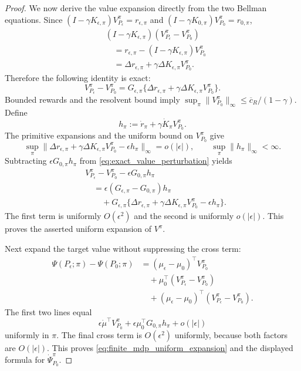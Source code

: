 \documentclass[10pt,a4paper]{amsart}
\begin{document}
\begin{proof}
    We now derive the value expansion directly from the two Bellman
    equations.  Since
    $(I-\gamma K_{\epsilon,\pi})V_{P_\epsilon}^\pi
      =r_{\epsilon,\pi}$ and
    $(I-\gamma K_{0,\pi})V_{P_0}^\pi=r_{0,\pi}$,
    \[
        \begin{aligned}
        &(I-\gamma K_{\epsilon,\pi})
        (V_{P_\epsilon}^\pi-V_{P_0}^\pi)\\
        &\quad=
        r_{\epsilon,\pi}
        -(I-\gamma K_{\epsilon,\pi})V_{P_0}^\pi\\
        &\quad=
        \Delta r_{\epsilon,\pi}
        +\gamma\Delta K_{\epsilon,\pi}V_{P_0}^\pi.
        \end{aligned}
    \]
    Therefore the following identity is exact:
    \begin{equation}\label{eq:exact_value_perturbation}
        V_{P_\epsilon}^\pi-V_{P_0}^\pi
        =
        G_{\epsilon,\pi}
        \{\Delta r_{\epsilon,\pi}
        +\gamma\Delta K_{\epsilon,\pi}V_{P_0}^\pi\}.
    \end{equation}
    Bounded rewards and the resolvent bound imply
    $\sup_\pi\|V_{P_0}^\pi\|_\infty
      \leq\overline c_R/(1-\gamma)$.
    Define
    \[
        h_\pi:=\dot r_\pi+\gamma\dot K_\pi V_{P_0}^\pi.
    \]
    The primitive expansions and the uniform bound on $V_{P_0}^\pi$
    give
    \[
        \sup_\pi
        \|\Delta r_{\epsilon,\pi}
        +\gamma\Delta K_{\epsilon,\pi}V_{P_0}^\pi
        -\epsilon h_\pi\|_\infty=o(|\epsilon|),
        \qquad
        \sup_\pi\|h_\pi\|_\infty<\infty.
    \]
    Subtracting $\epsilon G_{0,\pi}h_\pi$ from
    \eqref{eq:exact_value_perturbation} yields
    \[
        \begin{aligned}
        &V_{P_\epsilon}^\pi-V_{P_0}^\pi
        -\epsilon G_{0,\pi}h_\pi\\
        &\quad=
        \epsilon(G_{\epsilon,\pi}-G_{0,\pi})h_\pi\\
        &\qquad+
        G_{\epsilon,\pi}
        \{\Delta r_{\epsilon,\pi}
        +\gamma\Delta K_{\epsilon,\pi}V_{P_0}^\pi
        -\epsilon h_\pi\}.
        \end{aligned}
    \]
    The first term is uniformly $O(\epsilon^2)$ and the second is
    uniformly $o(|\epsilon|)$.  This proves the asserted uniform
    expansion of $V^\pi$.

    Next expand the target value without suppressing the cross term:
    \[
        \begin{aligned}
        \Psi(P_\epsilon;\pi)-\Psi(P_0;\pi)
        &=(\mu_\epsilon-\mu_0)^\top V_{P_0}^\pi\\
        &\quad+\mu_0^\top
        (V_{P_\epsilon}^\pi-V_{P_0}^\pi)\\
        &\quad+(\mu_\epsilon-\mu_0)^\top
        (V_{P_\epsilon}^\pi-V_{P_0}^\pi).
        \end{aligned}
    \]
    The first two lines equal
    \[
        \epsilon\dot\mu^\top V_{P_0}^\pi
        +\epsilon\mu_0^\top G_{0,\pi}h_\pi
        +o(|\epsilon|)
    \]
    uniformly in $\pi$.  The final cross term is
    $O(\epsilon^2)$ uniformly, because both factors are
    $O(|\epsilon|)$.  This proves
    \eqref{eq:finite_mdp_uniform_expansion} and the displayed formula
    for $\dot\Psi_{P_0}^\pi$.


\end{proof}
\end{document}
